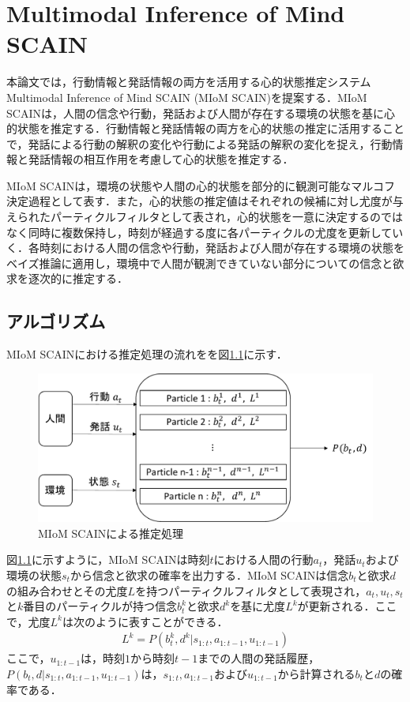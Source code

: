 \chapter{Multimodal Inference of Mind SCAIN}
\par
本論文では，行動情報と発話情報の両方を活用する心的状態推定システムMultimodal Inference of Mind SCAIN (MIoM SCAIN)を提案する．MIoM SCAINは，人間の信念や行動，発話および人間が存在する環境の状態を基に心的状態を推定する．行動情報と発話情報の両方を心的状態の推定に活用することで，発話による行動の解釈の変化や行動による発話の解釈の変化を捉え，行動情報と発話情報の相互作用を考慮して心的状態を推定する．

\par
MIoM SCAINは，環境の状態や人間の心的状態を部分的に観測可能なマルコフ決定過程として表す．また，心的状態の推定値はそれぞれの候補に対し尤度が与えられたパーティクルフィルタとして表され，心的状態を一意に決定するのではなく同時に複数保持し，時刻が経過する度に各パーティクルの尤度を更新していく．各時刻における人間の信念や行動，発話および人間が存在する環境の状態をベイズ推論に適用し，環境中で人間が観測できていない部分についての信念と欲求を逐次的に推定する．


\section{アルゴリズム}

\par
MIoM SCAINにおける推定処理の流れをを図\ref{fig:sys_arc}に示す．
\begin{figure}[htbp]
  \begin{center}
    \includegraphics[scale=0.7]{./bt1.pdf}
    \caption{MIoM SCAINによる推定処理}
    \label{fig:sys_arc}
  \end{center}
\end{figure}
図\ref{fig:sys_arc}に示すように，MIoM SCAINは時刻$t$における人間の行動$a_t$，発話$u_t$および環境の状態$s_t$から信念と欲求の確率を出力する．MIoM SCAINは信念$b_t$と欲求$d$の組み合わせとその尤度$L$を持つパーティクルフィルタとして表現され，$a_t,u_t,s_t$と$k$番目のパーティクルが持つ信念$b_t^k$と欲求$d^k$を基に尤度$L^k$が更新される．ここで，尤度$L^k$は次のように表すことができる．
\begin{equation}
  \begin{split}
  \label{pf}
  L^k=P(b_t^k,d^k|s_{1:t},a_{1:t-1},u_{1:t-1})
  \end{split}
\end{equation}
ここで，$u_{1:t-1}$は，時刻$1$から時刻$t-1$までの人間の発話履歴，$P(b_t,d|s_{1:t},a_{1:t-1},u_{1:t-1})$は，$s_{1:t},a_{1:t-1}およびu_{1:t-1}$から計算される$b_t$と$d$の確率である．

